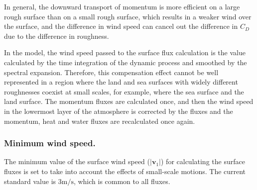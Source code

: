 In general, the downward transport of momentum is more efficient on a
large rough surface than on a small rough surface, which results in a
weaker wind over the surface, and the difference in wind speed can
cancel out the difference in \(C_D\) due to the difference in roughness.

In the model, the wind speed passed to the surface flux calculation is
the value calculated by the time integration of the dynamic process and
smoothed by the spectral expansion. Therefore, this compensation effect
cannot be well represented in a region where the land and sea surfaces
with widely different roughnesses coexist at small scales, for example,
where the sea surface and the land surface. The momentum fluxes are
calculated once, and then the wind speed in the lowermost layer of the
atmosphere is corrected by the fluxes and the momentum, heat and water
fluxes are recalculated once again.

\hypertarget{minimum-wind-speed.}{%
\subsubsection{Minimum wind speed.}\label{minimum-wind-speed.}}

The minimum value of the surface wind speed (\(|{\mathbf{v}}_1|\)) for
calculating the surface fluxes is set to take into account the effects
of small-scale motions. The current standard value is
\(3 \mathrm{m/s}\), which is common to all fluxes.
